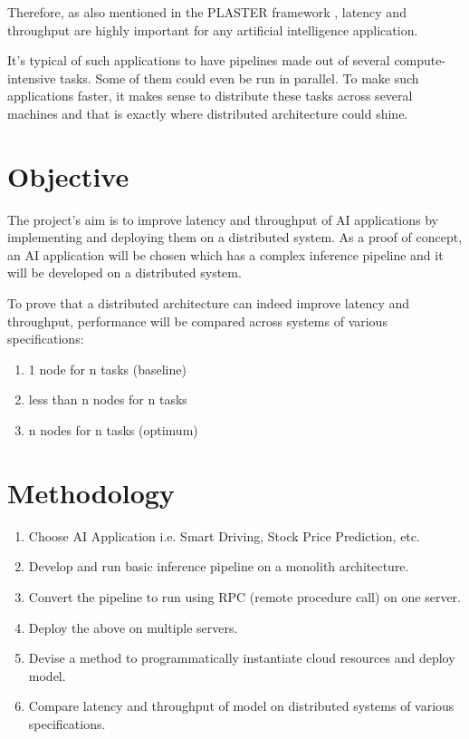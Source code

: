 \documentclass{article}
\begin{document}
Therefore, as also mentioned in the PLASTER framework \cite{Teich2018}, latency and throughput are highly important for any artificial intelligence application.

It's typical of such applications to have pipelines made out of several compute-intensive tasks. Some of them could even be run in parallel. To make such applications faster, it makes sense to distribute these tasks across several machines and that is exactly where distributed architecture could shine.

\section{Objective}
The project's aim is to improve latency and throughput of AI applications by implementing and deploying them on a distributed system. As a proof of concept, an AI application will be chosen which has a complex inference pipeline and it will be developed on a distributed system.

To prove that a distributed architecture can indeed improve latency and throughput, performance will be compared across systems of various specifications:
\begin{enumerate}
  \item 1 node for n tasks (baseline)
  \item less than n nodes for n tasks
  \item n nodes for n tasks (optimum)
\end{enumerate}

\section{Methodology}

\begin{enumerate}
  \item Choose AI Application i.e. Smart Driving, Stock Price Prediction, etc.
  \item Develop and run basic inference pipeline on a monolith architecture.
  \item Convert the pipeline to run using RPC (remote procedure call) on one server.
  \item Deploy the above on multiple servers.
  \item Devise a method to programmatically instantiate cloud resources and deploy model.
  \item Compare latency and throughput of model on distributed systems of various specifications.
\end{enumerate}
\end{document}
